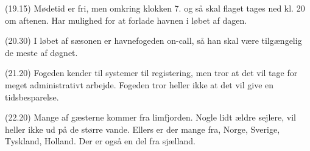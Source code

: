 \documentclass{article}
\begin{document}
(19.15) Mødetid er fri, men omkring klokken 7. og så skal flaget tages ned kl. 20 om aftenen. Har mulighed for at forlade havnen i løbet af dagen.

(20.30) I løbet af sæsonen er havnefogeden on-call, så han skal være tilgængelig de meste af døgnet.

(21.20) Fogeden kender til systemer til registering, men tror at det vil tage for meget administrativt arbejde. Fogeden tror heller ikke at det vil give en tidsbesparelse.

(22.20) Mange af gæsterne kommer fra limfjorden. Nogle lidt ældre sejlere, vil heller ikke ud på de større vande. Ellers er der mange fra, Norge, Sverige, Tyskland, Holland. Der er også en del fra sjælland.
\end{document}
